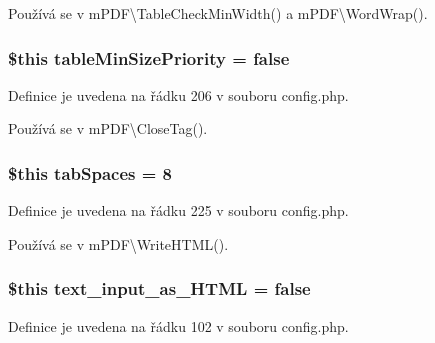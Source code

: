 Používá se v m\-P\-D\-F\textbackslash{}\-Table\-Check\-Min\-Width() a m\-P\-D\-F\textbackslash{}\-Word\-Wrap().

\hypertarget{config_8php_a05dcfe20b5f534fd91ef08f53e5b4e4e}{
\subsubsection[{table\-Min\-Size\-Priority}]{\setlength{\rightskip}{0pt plus 5cm}\$this table\-Min\-Size\-Priority = {\bf false}}}\label{config_8php_a05dcfe20b5f534fd91ef08f53e5b4e4e}


Definice je uvedena na řádku 206 v souboru config.\-php.



Používá se v m\-P\-D\-F\textbackslash{}\-Close\-Tag().

\hypertarget{config_8php_a8e51791a1b14963fb57535f1832126b8}{
\subsubsection[{tab\-Spaces}]{\setlength{\rightskip}{0pt plus 5cm}\$this tab\-Spaces = 8}}\label{config_8php_a8e51791a1b14963fb57535f1832126b8}


Definice je uvedena na řádku 225 v souboru config.\-php.



Používá se v m\-P\-D\-F\textbackslash{}\-Write\-H\-T\-M\-L().

\hypertarget{config_8php_ae916c1d351fdd8ebe360627f23169972}{
\subsubsection[{text\-\_\-input\-\_\-as\-\_\-\-H\-T\-M\-L}]{\setlength{\rightskip}{0pt plus 5cm}\$this text\-\_\-input\-\_\-as\-\_\-\-H\-T\-M\-L = {\bf false}}}\label{config_8php_ae916c1d351fdd8ebe360627f23169972}


Definice je uvedena na řádku 102 v souboru config.\-php.



